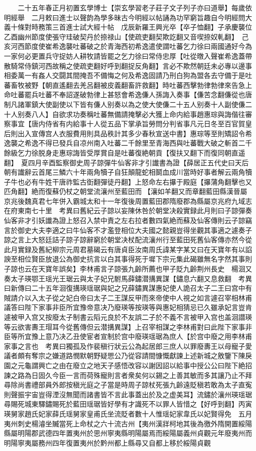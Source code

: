 　　二十五年春正月初置玄學博士【崇玄學習老子莊子文子列子亦曰道舉】每歲依明經舉　二月敕曰進士以聲韵為學多昧古今明經以帖誦為功罕窮旨趣自今明經問大義十條對時務策三首進士試大經十帖　戊辰新羅王興光卒【卒子恤翻】子承慶襲位　乙酉幽州節度使張守珪破契丹於捺禄山【使疏吏翻契欺訖翻又音喫捺奴軋翻】　己亥河西節度使崔希逸襲吐蕃破之於青海西初希逸遣使謂吐蕃乞力徐曰兩國通好今為一家何必更置兵守捉妨人耕牧請皆罷之乞力徐曰常侍忠厚【吐從暾入聲崔希逸蓋帶散騎常侍鎮河西故稱之使疏吏翻好呼到翻捉反角翻】言必不欺然朝廷未必專以邊事相委萬一有姦人交闘其間掩吾不備悔之何及希逸固請乃刑白狗為盟各去守備于是吐蕃畜牧被野【朝直遙翻去羌呂翻被皮義翻畜許救翻】時吐蕃西擊勃律勃律來告急上命吐蕃罷兵吐蕃不奉詔遂破勃律上甚怒會希逸傔人孫誨入奏事【傔苦念翻傔從也唐制凡諸軍鎮大使副使以下皆有傔人别奏以為之使大使傔二十五人别奏十人副使傔二十人别奏八人】自欲求功奏稱吐蕃無備請掩擊必大獲上命内給事趙惠琮與誨偕往審察事宜【唐内侍省有内給事十人從五品下掌承旨勞問分判省事凡元日冬至百官賀皇后則出入宣傳宫人衣服費用則具品秩計其多少春秋宣送中書】惠琮等至則矯詔令希逸襲之希逸不得已發兵自凉州南入吐蕃二千餘里至青海西與吐蕃戰大破之斬首二千餘級乞力徐脱身走惠琮誨皆受厚賞自是吐蕃復絶朝貢【復扶又翻下而復同朝直遥翻】　夏四月辛酉監察御史周子諒彈牛仙客非才引䜟書為證【薛居正五代史曰天后朝有䜟辭云首尾三鱗六十年兩角犢子自狂顛龍蛇相鬬血成川當時好事者解云兩角犢子牛也必有牛姓干唐祚監古衘翻彈徒丹翻】上怒命左右㩧于殿庭【㩧蒲角翻擊也又匹角翻】絶而復蘇仍杖之朝堂流瀼州至藍田而【瀼如羊翻又而章翻藍田縣漢晉屬京兆後魏真君七年併入霸城太和十一年復後周置藍田郡隋廢郡為縣屬京兆府九域志在府東南七十里　考異曰舊紀云子諒以妄陳休咎於朝堂决殺實録此月則曰子諒彈奏仙客非才引妖䜟為證上怒召入禁中責之左右拉者數四氣絶而蘇及仙客傳則云子諒竊言於御史大夫李適之曰牛仙客不才濫登相位大夫國之懿親豈得坐觀其事適之遽奏子諒之言上大怒廷詰子諒子諒辭窮於朝堂决杖配流瀼州行至藍田死舊仙客傳亦然今從此月實録及舊紀柳宗元周君墓碣云有唐貞臣汝南周氏諱某字某又曰在天寶年有以諂諛至相位賢臣放退公為御史抗言以白其事得死于墀下宗元集此碣雖無名字然其事則子諒也云在天寶年誤矣】李林甫言子諒張九齡所薦也甲子貶九齡荆州長史　楊洄又奏太子瑛鄂王瑶光王琚云與太子妃兄駙馬薛鏽潜搆異謀【鏽息六翻又息救翻　考異曰新傳曰二十五年洄復搆瑛瑶琚與妃之兄薛鏽異謀惠妃使人詭召太子二王曰宫中有賊請介以入太子從之妃白帝曰太子二王謀反甲而來帝使中人視之如言遽召宰相林甫議答曰陛下家事非臣所宜豫帝意决乃廢瑛等按瑛等與惠妃相猜忌已久雖承妃言豈肯遽被甲入宫又按廢太子制書云䧟元良於不友誤二子於不義不言被甲入宫也盖洄譛瑛等云欲害夀王瑁耳今從舊傳但云潜搆異謀】上召宰相謀之李林甫對曰此陛下家事非臣等所宜豫上意乃决乙丑使宦者宣制於宫中廢瑛瑶琚為庶人【於宫中廢之用李林甫家事之言也　考異曰獨孤及作裴稹行狀云公為起居郎三庶人以罪廢夀王以母寵子愛議者頗有奪宗之嫌道路憫默朝野疑愳公乃從容請間慷慨獻諫上述新城之敫鑒下陳戾園之元龜謂興亡之由在廢立之地天子感悟改容以謝因詔以給事中授公公曰陛下絶招諫之路為日固久今臣一言而荷殊寵則言者衆矣何以錫之上善其敏而多其讓乃止不拜尋除尚書禮部員外郎按稹光庭之子當是時周子諒杖死張九齡遠貶稹若敢為太子直寃則聲振宇宙豈得湮沒無聞而諸書皆不言此事蓋出於及之虚美耳】流鏽於瀼州瑛瑶琚尋賜死城東驛鏽賜死於藍田瑶琚皆好學有才識死不以罪人皆惜之【好呼到翻】丙寅瑛舅家趙氏妃家薛氏瑶舅家皇甫氏坐流貶者數十人惟瑶妃家韋氏以妃賢得免　五月夷州刺史楊濬坐贓當死上命杖之六十流古州【夷州漢牂柯地其後為徼外隋開置綏陽縣屬明陽郡武德四年置夷州於思州寧夷縣明陽屬焉而綏陽屬義州貞觀元年廢夷州而明陽寧夷屬務州四年復置夷州於黔州都上縣尋又自都上移於綏陽貞觀